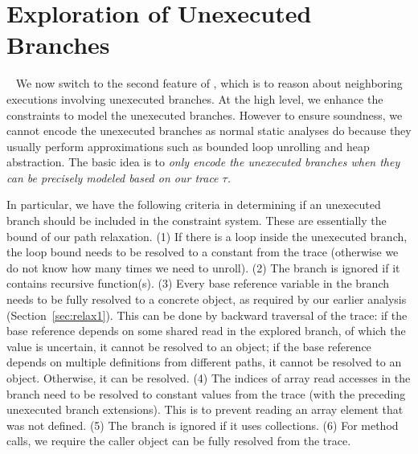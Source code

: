 \section{Exploration of Unexecuted Branches}~\label{sec:relax2}
We now switch to the second feature of \tool, which is to reason about 
neighboring executions involving unexecuted branches.
At the high level, we enhance the constraints to model the unexecuted branches.
However to ensure soundness, we cannot encode the unexecuted branches as
normal static analyses do because they usually perform approximations such as bounded
loop unrolling and heap abstraction. The basic idea is to {\em only encode the
unexecuted branches when they can be precisely modeled based on our trace 
$\tau$.} 

In particular, we have the following criteria in determining if an 
unexecuted branch should be included in the constraint system. These are 
essentially the bound of our path relaxation.
(1) If there is a loop inside the unexecuted branch, the loop bound needs to
be resolved to a constant from the trace (otherwise we do not know how many
times we need to unroll). (2) The branch
is ignored if it contains recursive function(s). (3) Every base reference 
variable in the branch needs to be fully resolved to a concrete object,
as required by our earlier analysis (Section~\ref{sec:relax1}). This can be 
done by backward traversal of the trace:
if the base reference depends on some shared read in the explored 
branch, of which the value is uncertain, it cannot be 
resolved to an object; if the base reference depends on multiple definitions 
from different paths, it cannot be resolved to an object.
Otherwise, it can be resolved.
(4) The indices of array read accesses in the branch 
need to be resolved to constant values from the trace (with the preceding unexecuted branch extensions). This is to
prevent reading an array element that was not defined. 
(5) The branch is ignored if it uses collections. 
(6) For method calls, we require the  caller object can be fully resolved from
the trace.
 
